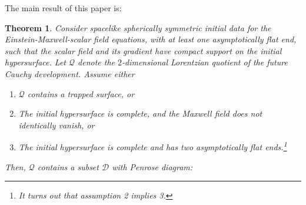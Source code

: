\documentclass{article}
\newtheorem{theorem}{Theorem}[section]
\begin{document}
The main result of this paper is:
\begin{theorem} 
\label{int-the}
Consider spacelike spherically symmetric initial 
data for the Einstein-Maxwell-scalar field equations, with at least one
asymptotically flat end, such that
the scalar field and its gradient have compact support on the initial
hypersurface. 
Let $\mathcal{Q}$ denote the $2$-dimensional Lorentzian quotient
of the future Cauchy development.
Assume either
\begin{enumerate}
\item 
$\mathcal{Q}$ contains a trapped surface, \emph{or}
\item 
The initial hypersurface is complete, and the Maxwell field does not identically
vanish, \emph{or}
\item
The initial hypersurface is complete and has two asymptotically flat 
ends.\footnote{It turns out that assumption 2 implies 3.}
\end{enumerate}
Then, $\mathcal{Q}$ contains a subset $\mathcal{D}$
with Penrose diagram:
\begin{figure}[h]
\centering

\label{ff}
\end{figure}


\end{theorem}
\end{document}
